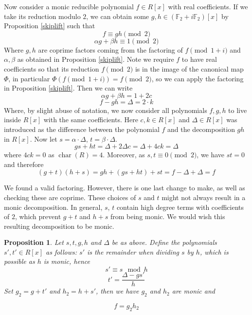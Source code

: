 \documentclass[a4paper, 12pt]{amsart}
\newtheorem{proposition}[lemma]{Proposition}
\theoremstyle{definition}
\newcommand{\F}{{\mathbb F}}
\DeclareMathOperator{\Char}{char}
\numberwithin{equation}{section}
\numberwithin{table}{section}
\begin{document}
Now consider a monic reducible polynomial $f \in R[x]$ with real coefficients. If we take its reduction modulo $2$, we can obtain  some $g,h\in (\F_2+i\F_2)[x]$ by Proposition \ref{skiplift} such that
\[f \equiv gh \pmod { 2 }\]
\[\alpha g + \beta h \equiv 1 \pmod { 2 } \]
Where $g,h$ are coprime factors coming from the factoring of $f \pmod{1+i}$ and $\alpha, \beta$ as obtained in Proposition \ref{skiplift}. Note we require $f$ to have real coefficients so that its reduction $f \pmod 2$ is in the image of the canonical map $\Phi$, in particular $\Phi(f \pmod{1+i}) = f \pmod 2$, so we can apply the factoring in Proposition \ref{skiplift}. Then we can write
\[\alpha g + \beta h = 1+2c\]
\[f-gh =  \Delta = 2 \cdot k\]
Where, by slight abuse of notation, we now consider all polynomials $f,g,h$ to live inside $R[x]$ with the same coefficients. Here $c,k \in R[x]$ and $\Delta\in R[x]$ was introduced as the difference between the polynomial $f$ and the decomposition $gh$ in $R[x]$.
Now let $s = \alpha \cdot \Delta$, $t = \beta \cdot \Delta$.
\[gs + ht = \Delta + 2 \Delta c = \Delta + 4ck = \Delta\]
where $4ck = 0$ as $\Char(R) = 4$.
Moreover, as $s,t \equiv 0 \pmod 2$, we have $st = 0$ and therefore
\[(g +t)(h+s) = gh +(gs + ht) + st = f-\Delta + \Delta  = f\]

We found a valid factoring. However, there is one last change to make, as well as checking these are coprime. These choices of $s$ and $t$ might not always result in a monic decomposition. In general, $s$, $t$ contain high degree terms with coefficients of $2$, which prevent $g+t$ and $h+s$ from being monic. We would wish this resulting decomposition to be monic.

\begin{proposition}\label{s'prop}
  Let $s,t,g,h$ and $\Delta$ be as above.  Define the polynomials $s',t' \in R[x]$ as follows:  $s'$ is the remainder when dividing $s$ by $h$, which is possible as $h$ is monic, hence 
    \[s' \equiv s\mod h\]
    \[t' = \frac{\Delta-gs'}{h}\]
    Set $g_2 = g+t'$ and $h_2 = h+s'$, then we have $g_2$ and $h_2$ are monic and

    \[f = g_2h_2\]
\end{proposition}
\end{document}

